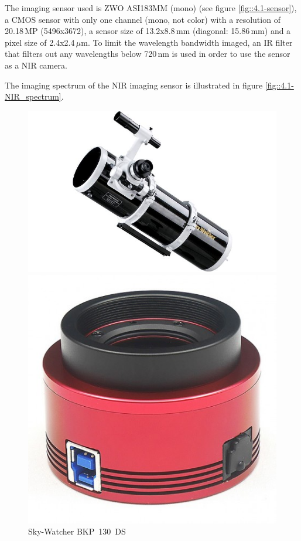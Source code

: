 The imaging sensor used is ZWO ASI183MM (mono) (see figure \ref{fig::4.1-sensor}), a CMOS sensor with only one channel (mono, not color) with a resolution of 20.18\,MP (5496x3672), a sensor size of 13.2x8.8\,mm (diagonal: 15.86\,mm) and a pixel size of 2.4x2.4\,$\mu$m. To limit the wavelength bandwidth imaged, an IR filter that filters out any wavelengths below 720\,nm is used in order to use the sensor as a NIR camera.

The imaging spectrum of the NIR imaging sensor is illustrated in figure \ref{fig::4.1-NIR_spectrum}.

\begin{figure}[h]
	\centering
	\begin{minipage}[t]{0.3\linewidth}
		\centering
		\includegraphics[width=1.0\linewidth]{4-experiment-design/img/setup/SkyWatcher_BKP130DS}
		\caption{Sky-Watcher BKP~130~DS}
		\label{fig::4.1-telescope}
	\end{minipage}
	\hspace{0.03\linewidth}
	\begin{minipage}[t]{0.3\linewidth}
		\centering
		\includegraphics[width=0.65\linewidth]{4-experiment-design/img/setup/ZWO_ASI183MM}

\end{minipage}
\end{figure}
